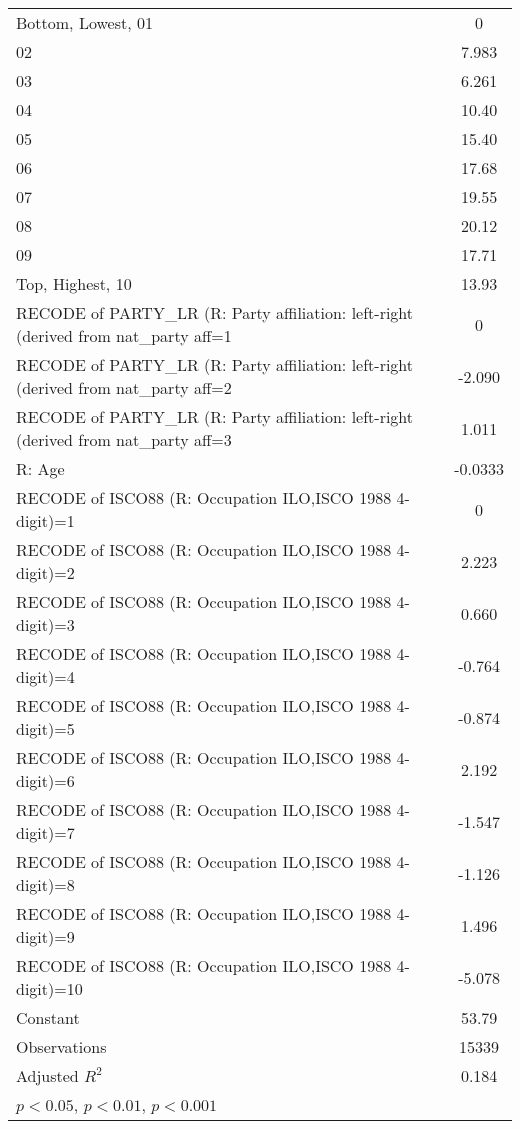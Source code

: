 \begin{table}[htbp]
\begin{tabular}{l*{1}{c}}
Bottom, Lowest, 01  &           0         \\
02                  &       7.983\sym{***}\\
03                  &       6.261\sym{***}\\
04                  &       10.40\sym{***}\\
05                  &       15.40\sym{***}\\
06                  &       17.68\sym{***}\\
07                  &       19.55\sym{***}\\
08                  &       20.12\sym{***}\\
09                  &       17.71\sym{***}\\
Top, Highest, 10    &       13.93\sym{***}\\
RECODE of PARTY\_LR (R: Party affiliation: left-right (derived from nat\_party aff=1&           0         \\
RECODE of PARTY\_LR (R: Party affiliation: left-right (derived from nat\_party aff=2&      -2.090\sym{**} \\
RECODE of PARTY\_LR (R: Party affiliation: left-right (derived from nat\_party aff=3&       1.011         \\
R: Age              &     -0.0333         \\
RECODE of ISCO88 (R: Occupation ILO,ISCO 1988 4-digit)=1&           0         \\
RECODE of ISCO88 (R: Occupation ILO,ISCO 1988 4-digit)=2&       2.223\sym{*}  \\
RECODE of ISCO88 (R: Occupation ILO,ISCO 1988 4-digit)=3&       0.660         \\
RECODE of ISCO88 (R: Occupation ILO,ISCO 1988 4-digit)=4&      -0.764         \\
RECODE of ISCO88 (R: Occupation ILO,ISCO 1988 4-digit)=5&      -0.874         \\
RECODE of ISCO88 (R: Occupation ILO,ISCO 1988 4-digit)=6&       2.192         \\
RECODE of ISCO88 (R: Occupation ILO,ISCO 1988 4-digit)=7&      -1.547         \\
RECODE of ISCO88 (R: Occupation ILO,ISCO 1988 4-digit)=8&      -1.126         \\
RECODE of ISCO88 (R: Occupation ILO,ISCO 1988 4-digit)=9&       1.496         \\
RECODE of ISCO88 (R: Occupation ILO,ISCO 1988 4-digit)=10&      -5.078         \\
Constant            &       53.79\sym{***}\\
\hline
Observations        &       15339         \\
Adjusted \(R^{2}\)  &       0.184         \\
\hline\hline
\multicolumn{2}{l}{\footnotesize \sym{*} \(p<0.05\), \sym{**} \(p<0.01\), \sym{***} \(p<0.001\)}\\
\end{tabular}
\end{table}
